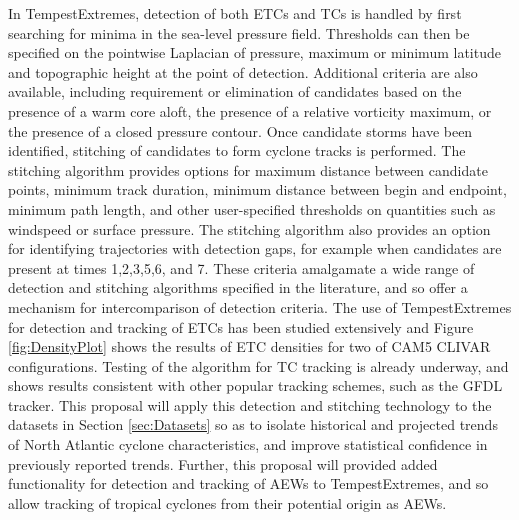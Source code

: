 \documentclass[11pt]{article}
\begin{document}
In TempestExtremes, detection of both ETCs and TCs is handled by first searching for minima in the sea-level pressure field.  Thresholds can then be specified on the pointwise Laplacian of pressure, maximum or minimum latitude and topographic height at the point of detection.  Additional criteria are also available, including requirement or elimination of candidates based on the presence of a warm core aloft, the presence of a relative vorticity maximum, or the presence of a closed pressure contour.  Once candidate storms have been identified, stitching of candidates to form cyclone tracks is performed.  The stitching algorithm provides options for maximum distance between candidate points, minimum track duration, minimum distance between begin and endpoint, minimum path length, and other user-specified thresholds on quantities such as windspeed or surface pressure.  The stitching algorithm also provides an option for identifying trajectories with detection gaps, for example when candidates are present at times 1,2,3,5,6, and 7.  These criteria amalgamate a wide range of detection and stitching algorithms specified in the literature, and so offer a mechanism for intercomparison of detection criteria.  The use of TempestExtremes for detection and tracking of ETCs has been studied extensively and Figure \ref{fig:DensityPlot} shows the results of ETC densities for two of CAM5 CLIVAR configurations.  Testing of the algorithm for TC tracking is already underway, and shows results consistent with other popular tracking schemes, such as the GFDL tracker. This proposal will apply this detection and stitching technology to the datasets in Section \ref{sec:Datasets} so as to isolate historical and projected trends of North Atlantic cyclone characteristics, and improve statistical confidence in previously reported trends.  Further, this proposal will provided added functionality for detection and tracking of AEWs to TempestExtremes, and so allow tracking of tropical cyclones from their potential origin as AEWs.
\end{document}
